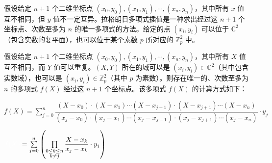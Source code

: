 假设给定 $n+1$ 个二维坐标点 $(x_0, y_0), (x_1, y_1), \cdots, (x_n, y_n)$，其中所有 $x$ 值互不相同，但 $y$ 值不一定互异。拉格朗日多项式插值是一种求出经过这 $n+1$ 个坐标点、次数至多为 $n$ 的唯一多项式的方法。给定的点 $(x_i,y_i)$ 可以位于 $\mathbb{C}^2$（包含实数的复平面），也可以位于某个素数 $p$ 所对应的 $\mathbb{Z}_p^2$ 中。


\begin{tcolorbox}[title={\textbf{\tboxtheorem{\ref*{sec:polynomial-interpolation}} 拉格朗日多项式插值}}]

假设给定 $n+1$ 个二维坐标点 $(x_0, y_0), (x_1, y_1), \cdots, (x_n, y_n)$，其中所有 $X$ 值互不相同，而 $Y$ 值可以重复。$(X, Y)$ 所在的域可以是 $(x_i, y_i) \in \mathbb{C}^2$（其中包含实数域），也可以是 $(x_i, y_i) \in \mathbb{Z}_p^2$（其中 $p$ 为素数）。则存在唯一的、次数至多为 $n$ 的多项式 $f(X)$ 经过这 $n+1$ 个坐标点。该多项式 $f(X)$ 的计算方式如下：

$f(X) = \sum\limits_{j=0}^{n}\dfrac{(X-x_0)\cdot(X-x_1)\cdots(X-x_{j-1})\cdot(X-x_{j+1})\cdots(X-x_{n})}{(x_j-x_0)\cdot(x_j-x_1)\cdots(x_j-x_{j-1})\cdot(x_j-x_{j+1})\cdots(x_j-x_{n})}\cdot y_j$

$\textcolor{white}{f(X) }= \sum\limits_{j=0}^{n} \left( \prod\limits_{\substack{0 \le k \le n\\ k \ne j}} \dfrac{X - x_k}{x_j - x_k} \cdot y_j\right)$

\end{tcolorbox}

